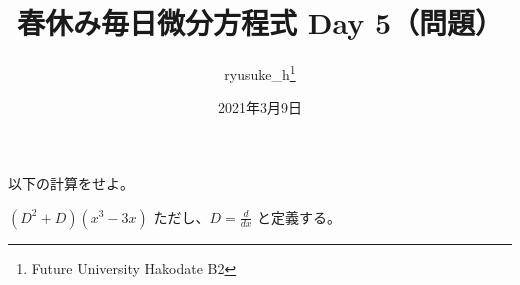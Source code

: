 \documentclass[a4j]{jsarticle}
\title{春休み毎日微分方程式 Day 5（問題）}
\author{ryusuke\_h\thanks{Future University Hakodate B2}}
\date{2021年3月9日}
\begin{document}
\begin{spacing}{1.6}
\maketitle

以下の計算をせよ。
\begin{qparts}
    \qpart $ \displaystyle (D ^ 2 + D)(x ^ 3 - 3x) $ \quad ただし、$ \displaystyle D = \frac{d}{dx} $ と定義する。\\
\end{qparts}
\end{spacing}
\end{document}
